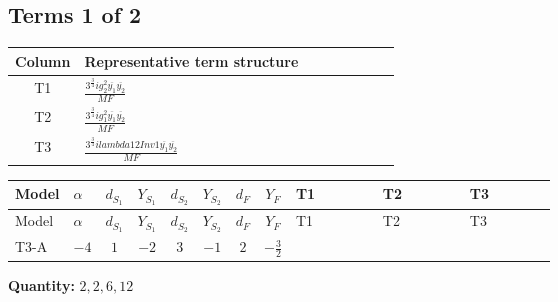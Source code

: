 \documentclass[8pt]{article}
\begin{document}
\begin{landscape}
\subsection*{Terms 1 of 2}
\begin{center}
\begin{tabular}{@{}c >{\raggedright\arraybackslash}p{0.82\linewidth}@{}}
\toprule
Column & Representative term structure \\
\midrule
T1 & \(\displaystyle \frac{3^{\frac{3}{4}} i g_{2}^{2} \overline{y_{1}} \overline{y_{2}}}{MF}\) \\
\midrule
T2 & \(\displaystyle \frac{3^{\frac{3}{4}} i g_{1}^{2} \overline{y_{1}} \overline{y_{2}}}{MF}\) \\
\midrule
T3 & \(\displaystyle \frac{3^{\frac{3}{4}} i lambda12Inv1 \overline{y_{1}} \overline{y_{2}}}{MF}\) \\
\midrule
\bottomrule
\end{tabular}
\end{center}
\smallskip
\tiny
\begin{longtable}{@{}llcccccc >{\raggedright\arraybackslash}p{0.21\linewidth} >{\raggedright\arraybackslash}p{0.21\linewidth} >{\raggedright\arraybackslash}p{0.21\linewidth}@{}}
\toprule
Model & $\alpha$ & $d_{S_1}$ & $Y_{S_1}$ & $d_{S_2}$ & $Y_{S_2}$ & $d_F$ & $Y_F$ & T1 & T2 & T3 \\
\midrule
\endfirsthead
\toprule
Model & $\alpha$ & $d_{S_1}$ & $Y_{S_1}$ & $d_{S_2}$ & $Y_{S_2}$ & $d_F$ & $Y_F$ & T1 & T2 & T3 \\
\midrule
\endhead
T3-A & $-4$ & $1$ & $-2$ & $3$ & $-1$ & $2$ & $-\frac{3}{2}$ & \scriptsize\adjustbox{max width=\linewidth}{$\begin{gathered} - \frac{11 \cdot 3^{\frac{3}{4}} i g_{2}^{2} \overline{y_{1}} \overline{y_{2}}}{8 MF}\end{gathered}$} & \scriptsize\adjustbox{max width=\linewidth}{$\begin{gathered} - \frac{9 \cdot 3^{\frac{3}{4}} i g_{1}^{2} \overline{y_{1}} \overline{y_{2}}}{8 MF}\end{gathered}$} & \scriptsize\adjustbox{max width=\linewidth}{$\begin{gathered} - \frac{3^{\frac{3}{4}} i lambda12Inv1 \overline{y_{1}} \overline{y_{2}}}{6 MF}\end{gathered}$} \\
\midrule
\bottomrule
\end{longtable}
\clearpage
\noindent\textbf{Quantity: }$\mathrm{2,2,6,12}$\par\smallskip

\end{landscape}
\end{document}
